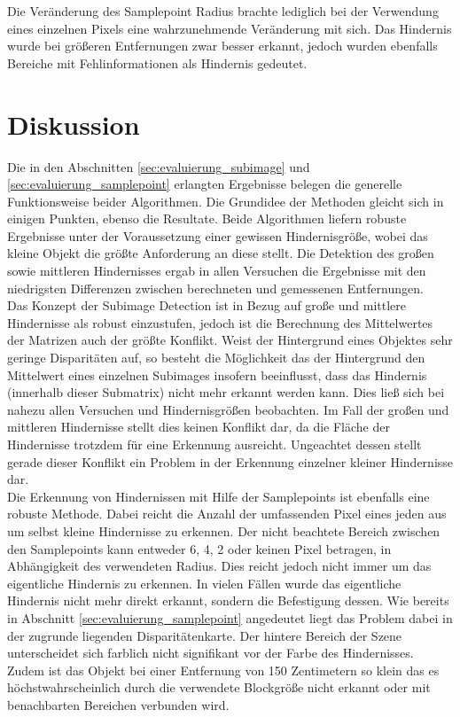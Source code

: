 \noindent
Die Veränderung des Samplepoint Radius brachte lediglich bei der Verwendung eines einzelnen Pixels eine wahrzunehmende Veränderung mit sich. Das Hindernis wurde bei größeren Entfernungen zwar besser erkannt, jedoch wurden ebenfalls Bereiche mit Fehlinformationen als Hindernis gedeutet.

\section{Diskussion}
\label{sec:evaluation_Diskussion}

Die in den Abschnitten \ref{sec:evaluierung_subimage} und \ref{sec:evaluierung_samplepoint} erlangten Ergebnisse belegen die generelle Funktionsweise beider Algorithmen. Die Grundidee der Methoden gleicht sich in einigen Punkten, ebenso die Resultate. Beide Algorithmen liefern robuste Ergebnisse unter der Voraussetzung einer gewissen Hindernisgröße, wobei das kleine Objekt die größte Anforderung an diese stellt. Die Detektion des großen sowie mittleren Hindernisses ergab in allen Versuchen die Ergebnisse mit den niedrigsten Differenzen zwischen berechneten und gemessenen Entfernungen.\\

\noindent
Das Konzept der Subimage Detection ist in Bezug auf große und mittlere Hindernisse als robust einzustufen, jedoch ist die Berechnung des Mittelwertes der Matrizen auch der größte Konflikt. Weist der Hintergrund eines Objektes sehr geringe Disparitäten auf, so besteht die Möglichkeit das der Hintergrund den Mittelwert eines einzelnen Subimages insofern beeinflusst, dass das Hindernis (innerhalb dieser Submatrix) nicht mehr erkannt werden kann. Dies ließ sich bei nahezu allen Versuchen und Hindernisgrößen beobachten. Im Fall der großen und mittleren Hindernisse stellt dies keinen Konflikt dar, da die Fläche der Hindernisse trotzdem für eine Erkennung ausreicht. Ungeachtet dessen stellt gerade dieser Konflikt ein Problem in der Erkennung einzelner kleiner Hindernisse dar.\\

\noindent
Die Erkennung von Hindernissen mit Hilfe der Samplepoints ist ebenfalls eine robuste Methode. Dabei reicht die Anzahl der umfassenden Pixel eines jeden aus um selbst kleine Hindernisse zu erkennen. Der nicht beachtete Bereich zwischen den Samplepoints kann entweder 6, 4, 2 oder keinen Pixel betragen, in Abhängigkeit des verwendeten Radius. Dies reicht jedoch nicht immer um das eigentliche Hindernis zu erkennen. In vielen Fällen wurde das eigentliche Hindernis nicht mehr direkt erkannt, sondern die Befestigung dessen. Wie bereits in Abschnitt \ref{sec:evaluierung_samplepoint} angedeutet liegt das Problem dabei in der zugrunde liegenden Disparitätenkarte. Der hintere Bereich der Szene unterscheidet sich farblich nicht signifikant vor der Farbe des Hindernisses. Zudem ist das Objekt bei einer Entfernung von 150 Zentimetern so klein das es höchstwahrscheinlich durch die verwendete Blockgröße nicht erkannt oder mit benachbarten Bereichen verbunden wird.\\

